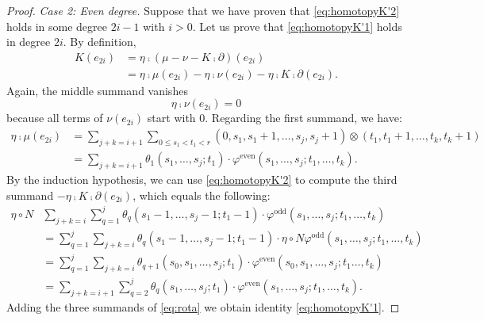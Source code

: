 {\begin{proof}
    \noindent\emph{Case 2: Even degree.} Suppose that we have proven that \eqref{eq:homotopyK'2} holds in some degree $2i-1$ with $i>0$. Let us prove that \eqref{eq:homotopyK'1} holds in degree $2i$. By definition,
	\begin{equation}\label{eq:rota}
    \begin{split}
	    K(e_{2i}) &= \eta \comp (\mu-\nu-K \comp \partial)(e_{2i})\\
     &= \eta \comp\mu(e_{2i})- \eta\comp\nu(e_{2i})- \eta\comp K \comp \partial(e_{2i}).
	\end{split}
    \end{equation}
	Again, the middle summand vanishes
    \[\eta \comp \nu(e_{2i}) = 0
    \]
    because all terms of $\nu(e_{2i})$ start with $0$. Regarding the first summand, we have:
    \begin{equation*}%
    \begin{split}
        \eta\comp \mu(e_{2i}) &= \sum_{j+k=i+1}\sum_{0\leq s_1<t_1<r} (0,s_1,s_1+1,\ldots,s_j,s_j+1)\otimes (t_1,t_1+1,\ldots,t_k,t_k+1)
        \\
    &= \sum_{j+k=i+1}\theta_1(s_1,\dots,s_j;t_1)\cdot \varphi^{\mathrm{even}}(s_1,\dots,s_j;t_1,\dots,t_k).
	\end{split}
    \end{equation*}
	By the induction hypothesis, we can use \eqref{eq:homotopyK'2} to compute the third summand $-\eta \comp K \comp \partial(e_{2i})$, which equals the following:
	\begin{equation*}%
    \begin{split}
        \eta\circ N&\sum_{j+k=i}\sum_{q=1}^{j}\theta_q(s_1-1,\dots,s_j-1;t_1-1)\cdot \varphi^{\mathrm{odd}}(s_1,\dots,s_j;t_1,\dots,t_k) \\
     	&= \sum_{q=1}^{j}\sum_{j+k=i}\theta_q(s_1-1,\dots,s_j-1;t_1-1)\cdot \eta\circ N\varphi^{\mathrm{odd}}(s_1,\dots,s_j;t_1,\dots,t_k) \\
     &= \sum_{q=1}^{j}\sum_{j+k=i}\theta_{q+1}(s_0,s_1,\dots,s_{j};t_1)\cdot \varphi^{\mathrm{even}}(s_0,s_1,\dots,s_{j};t_1\dots,t_k)
\\ &= \sum_{j+k = i+1}\sum_{q=2}^{j}\theta_q(s_1,\dots,s_{j};t_1)\cdot \varphi^{\mathrm{even}}(s_1,\dots,s_{j};t_1,\dots,t_k).
	\end{split}
    \end{equation*}
	Adding the three summands of \eqref{eq:rota} we obtain identity \eqref{eq:homotopyK'1}.
\end{proof}

}
